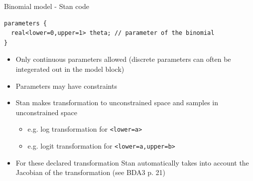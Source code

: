 \documentclass[finnish,english,t]{beamer}
\begin{document}
\begin{frame}[fragile]{Binomial model - Stan code}

  {\small
\begin{verbatim}
parameters {
  real<lower=0,upper=1> theta; // parameter of the binomial
}
\end{verbatim}
  }

  \begin{itemize}
  \item Only continuous parameters allowed (discrete parameters can
    often be integerated out in the model block)
  \item Parameters may have constraints
  \item Stan makes transformation to unconstrained space and samples in unconstrained space
    \begin{itemize}
    \item e.g. log transformation for \texttt{<lower=a>}
    \item e.g. logit transformation for \texttt{<lower=a,upper=b>}
    \end{itemize}
  \item<2-> For these declared transformation Stan automatically takes
    into account the Jacobian of the transformation (see BDA3 p. 21)
  \end{itemize}
\end{frame}
\end{document}
